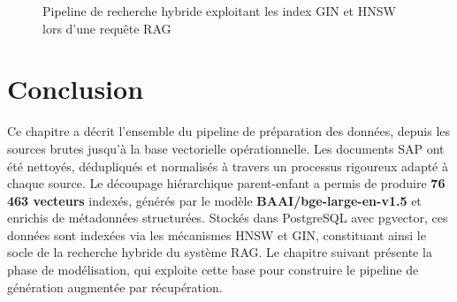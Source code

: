 \begin{figure}[H]
\caption{Pipeline de recherche hybride exploitant les index GIN et HNSW lors d'une
         requête RAG}
\label{fig:recherche-meta}
\end{figure}

\section*{Conclusion}

Ce chapitre a décrit l'ensemble du pipeline de préparation des données, depuis les sources brutes jusqu'à la base vectorielle opérationnelle. Les documents SAP ont été nettoyés, dédupliqués et normalisés à travers un processus rigoureux adapté à chaque source. Le découpage hiérarchique parent-enfant a permis de produire \textbf{76\,463 vecteurs} indexés, générés par le modèle \textbf{BAAI/bge-large-en-v1.5} et enrichis de métadonnées structurées. Stockés dans PostgreSQL avec pgvector, ces données sont indexées via les mécanismes HNSW et GIN, constituant ainsi le socle de la recherche hybride du système RAG. Le chapitre suivant présente la phase de modélisation, qui exploite cette base pour construire le pipeline de génération augmentée par récupération.
